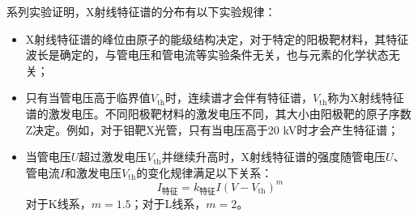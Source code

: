 \documentclass[11pt,a4paper]{article}
\begin{document}
系列实验证明，X射线特征谱的分布有以下实验规律：
\begin{itemize}
\item X射线特征谱的峰位由原子的能级结构决定，对于特定的阳极靶材料，其特征波长是确定的，与管电压和管电流等实验条件无关，也与元素的化学状态无关；
\item 只有当管电压高于临界值$V_{\text{th}}$时，连续谱才会伴有特征谱，$V_{\text{th}}$称为X射线特征谱的激发电压。不同阳极靶材料的激发电压不同，其大小由阳极靶的原子序数Z决定。例如，对于钼靶X光管，只有当电压高于20 kV时才会产生特征谱；
\item 当管电压$U$超过激发电压$V_{\text{th}}$并继续升高时，X射线特征谱的强度随管电压$U$、管电流$I$和激发电压$V_{\text{th}}$的变化规律满足以下关系：
\begin{equation}
I_{\text{特征}}=k_{\text{特征}}I(V-V_{\text{th}})^m
\end{equation}
对于K线系，$m=1.5$；对于L线系，$m=2$。
\end{itemize}
\end{document}
